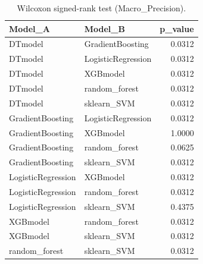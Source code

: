 \begin{table}[t]
\centering
\begin{tabular}{llr}
\toprule
Model_A & Model_B & p_value \\
\midrule
DTmodel & GradientBoosting & 0.0312 \\
DTmodel & LogisticRegression & 0.0312 \\
DTmodel & XGBmodel & 0.0312 \\
DTmodel & random_forest & 0.0312 \\
DTmodel & sklearn_SVM & 0.0312 \\
GradientBoosting & LogisticRegression & 0.0312 \\
GradientBoosting & XGBmodel & 1.0000 \\
GradientBoosting & random_forest & 0.0625 \\
GradientBoosting & sklearn_SVM & 0.0312 \\
LogisticRegression & XGBmodel & 0.0312 \\
LogisticRegression & random_forest & 0.0312 \\
LogisticRegression & sklearn_SVM & 0.4375 \\
XGBmodel & random_forest & 0.0312 \\
XGBmodel & sklearn_SVM & 0.0312 \\
random_forest & sklearn_SVM & 0.0312 \\
\bottomrule
\end{tabular}
\caption{Wilcoxon signed-rank test (Macro_Precision).}
\label{tab:wilcoxon_Macro_Precision}
\end{table}